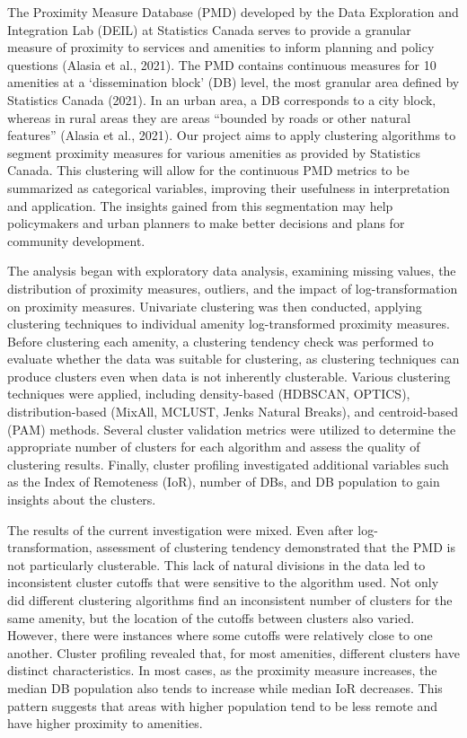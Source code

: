 \documentclass[11pt, a4paper]{article}
\begin{document}
\normalsize
The Proximity Measure Database (PMD) developed by the Data Exploration and Integration Lab (DEIL) at Statistics Canada serves to provide a granular measure of proximity to services and amenities to inform planning and policy questions (Alasia et al., 2021). The PMD contains continuous measures for 10 amenities at a `dissemination block' (DB) level, the most granular area defined by Statistics Canada (2021). In an urban area, a DB corresponds to a city block, whereas in rural areas they are areas “bounded by roads or other natural features” (Alasia et al., 2021). Our project aims to apply clustering algorithms to segment proximity measures for various amenities as provided by Statistics Canada. This clustering will allow for the continuous PMD metrics to be summarized as categorical variables, improving their usefulness in interpretation and application. The insights gained from this segmentation may help policymakers and urban planners to make better decisions and plans for community development.
\par
\hspace{1pc} The analysis began with exploratory data analysis, examining missing values, the distribution of proximity measures, outliers, and the impact of log-transformation on proximity measures. Univariate clustering was then conducted, applying clustering techniques to individual amenity log-transformed proximity measures. Before clustering each amenity, a clustering tendency check was performed to evaluate whether the data was suitable for clustering, as clustering techniques can produce clusters even when data is not inherently clusterable. Various clustering techniques were applied, including density-based (HDBSCAN, OPTICS), distribution-based (MixAll, MCLUST, Jenks Natural Breaks), and centroid-based (PAM) methods. Several cluster validation metrics were utilized to determine the appropriate number of clusters for each algorithm and assess the quality of clustering results. Finally, cluster profiling investigated additional variables such as the Index of Remoteness (IoR), number of DBs, and DB population to gain insights about the clusters.
\par
\hspace{1pc} The results of the current investigation were mixed. Even after log-transformation, assessment of clustering tendency demonstrated that the PMD is not particularly clusterable. This lack of natural divisions in the data led to inconsistent cluster cutoffs that were sensitive to the algorithm used. Not only did different clustering algorithms find an inconsistent number of clusters for the same amenity, but the location of the cutoffs between clusters also varied. However, there were instances where some cutoffs were relatively close to one another. Cluster profiling revealed that, for most amenities, different clusters have distinct characteristics. In most cases, as the proximity measure increases, the median DB population also tends to increase while median IoR decreases. This pattern suggests that areas with higher population tend to be less remote and have higher proximity to amenities.
\end{document}
